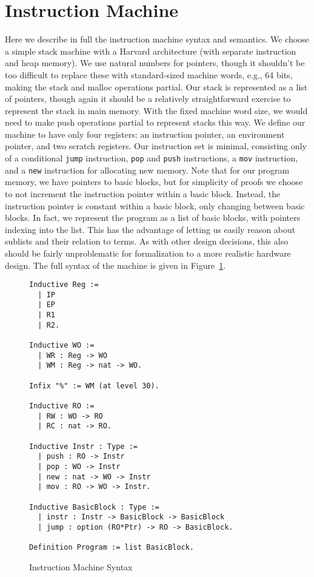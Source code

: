 \section{Instruction Machine} \label{sec:im_semantics}

Here we describe in full the instruction machine syntax and semantics. We
choose a simple stack machine with a Harvard architecture (with separate
instruction and heap memory). We use natural numbers for pointers, though it
shouldn't be too difficult to replace these with standard-sized machine words,
e.g., 64 bits, making the stack and malloc operations partial. Our stack is
represented as a list of pointers, though again it should be a relatively
straightforward exercise to represent the stack in main memory. With the fixed
machine word size, we would need to make push operations partial to represent
stacks this way. We define our machine to have only four registers: an
instruction pointer, an environment pointer, and two scratch registers. Our
instruction set is minimal, consisting only of a conditional \texttt{jump}
instruction, \texttt{pop} and \texttt{push} instructions, a \texttt{mov}
instruction, and a \texttt{new} instruction for allocating new memory. Note that
for our program memory, we have pointers to basic blocks, but for simplicity of
proofs we choose to not increment the instruction pointer within a basic block.
Instead, the instruction pointer is constant within a basic block, only changing
between basic blocks. In fact, we represent the program as a list of basic
blocks, with pointers indexing into the list. This has the advantage of letting
us easily reason about sublists and their relation to terms. As with other
design decisions, this also should be fairly unproblematic for formalization to
a more realistic hardware design. The full syntax of the machine is given in
Figure~\ref{fig:im_syntax}.  

\begin{figure}
\begin{lstlisting}
Inductive Reg := 
  | IP
  | EP
  | R1
  | R2.

Inductive WO := 
  | WR : Reg -> WO
  | WM : Reg -> nat -> WO.

Infix "%" := WM (at level 30).

Inductive RO := 
  | RW : WO -> RO
  | RC : nat -> RO.

Inductive Instr : Type :=
  | push : RO -> Instr
  | pop : WO -> Instr
  | new : nat -> WO -> Instr 
  | mov : RO -> WO -> Instr.

Inductive BasicBlock : Type :=
  | instr : Instr -> BasicBlock -> BasicBlock
  | jump : option (RO*Ptr) -> RO -> BasicBlock.

Definition Program := list BasicBlock.
\end{lstlisting}
\caption{Instruction Machine Syntax}
\label{fig:im_syntax}
\end{figure}

